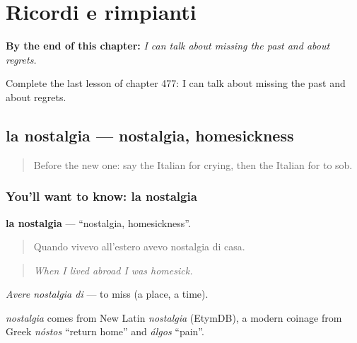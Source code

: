 
\chapter{Ricordi e rimpianti}
\label{ch:it-ricordi-e-rimpianti}

\begin{chapteropening}
\textbf{By the end of this chapter:} \emph{I can talk about missing the past and about regrets.}

Complete the last lesson of chapter 477: I can talk about missing the past and about regrets.
\end{chapteropening}

\section[la nostalgia]{la nostalgia — nostalgia, homesickness}

\label{lesson:IT-C477-nostalgia}



\begin{quote}
Before the new one: say the Italian for crying, then the Italian for to sob.
\end{quote}

\subsection*{You'll want to know: la nostalgia}
\textbf{la nostalgia} — \textquotedblleft{}nostalgia, homesickness\textquotedblright{}.

\begin{quote}
Quando vivevo all'estero avevo nostalgia di casa.
\end{quote}

\begin{quote}
\emph{When I lived abroad I was homesick.}
\end{quote}

\emph{Avere nostalgia di} — to miss (a place, a time).

\begin{cousinweb}
\emph{nostalgia} comes from New Latin \emph{nostalgia} (EtymDB), a modern coinage from Greek \emph{nóstos} \textquotedblleft{}return home\textquotedblright{} and \emph{álgos} \textquotedblleft{}pain\textquotedblright{}.
\end{cousinweb}

